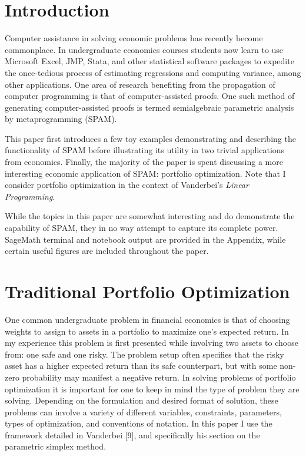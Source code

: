 \documentclass{article}
\begin{document}
\pagebreak
{}
\section{Introduction}

Computer assistance in solving economic problems has recently become commonplace. In undergraduate economics courses students now learn to use Microsoft Excel, JMP, Stata, and other statistical software packages to expedite the once-tedious process of estimating regressions and computing variance, among other applications. One area of research benefiting from the propagation of computer programming is that of computer-assisted proofs. One such method of generating computer-assisted proofs is termed semialgebraic parametric analysis by metaprogramming (SPAM).

This paper first introduces a few toy examples demonstrating and describing the functionality of SPAM before illustrating its utility in two trivial applications from economics. Finally, the majority of the paper is spent discussing a more interesting economic application of SPAM: portfolio optimization. Note that I consider portfolio optimization in the context of Vanderbei's \textit{Linear Programming}.

While the topics in this paper are somewhat interesting and do demonstrate the capability of SPAM, they in no way attempt to capture its complete power. SageMath terminal and notebook output are provided in the Appendix, while certain useful figures are included throughout the paper.


\section{Traditional Portfolio Optimization}

One common undergraduate problem in financial economics is that of choosing weights to assign to assets in a portfolio to maximize one's expected return. In my experience this problem is first presented while involving two assets to choose from: one safe and one risky. The problem setup often specifies that the risky asset has a higher expected return than its safe counterpart, but with some non-zero probability may manifest a negative return. In solving problems of portfolio optimization it is important for one to keep in mind the type of problem they are solving. Depending on the formulation and desired format of solution, these problems can involve a variety of different variables, constraints, parameters, types of optimization, and conventions of notation. In this paper I use the framework detailed in Vanderbei [9], and specifically his section on the parametric simplex method. 
\end{document}
